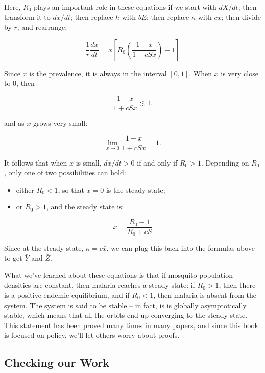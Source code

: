 \documentclass[
]{book}
\begin{document}
Here, \(R_0\) plays an important role in these equations if we start with \(dX/dt\); then transform it to \(dx/dt\); then replace \(h\) with \(bE\); then replace \(\kappa\) with \(cx\); then divide by \(r\); and rearrange:

\begin{equation}
\frac{1}{r} \frac{dx}{dt} = x \left[R_0 \left(\frac{1-x}{1 + cSx} \right)  - 1\right]  
\end{equation}

Since \(x\) is the prevalence, it is always in the interval \([0,1]\). When \(x\) is very close to \(0\), then

\begin{equation}
\frac{1-x}{1 + cSx} \lesssim 1. 
\end{equation}

and as \(x\) grows very small:

\begin{equation}
\lim_{x \rightarrow 0} \frac{1-x}{1 + cSx} = 1. 
\end{equation}

It follows that when \(x\) is small, \(dx/dt>0\) if and only if \(R_0 > 1\). Depending on \(R_0\), only one of two possibilities can hold:

\begin{itemize}
\item
  either \(R_0<1\), so that \(x=0\) is the steady state;
\item
  or \(R_0 > 1\), and the steady state is:
\end{itemize}

\begin{equation}
\bar x = \frac{R_0 -1}{R_0 + c S} 
\end{equation}

Since at the steady state, \(\kappa = c \bar x\), we can plug this back into the formulas above to get \(\bar Y\) and \(\bar Z\).

What we've learned about these equations is that if mosquito population densities are constant, then malaria reaches a steady state: if \(R_0 >1\), then there is a positive endemic equilibrium, and if \(R_0 < 1\), then malaria is absent from the system. The system is said to be stable -- in fact, is is globally asymptotically stable, which means that all the orbits end up converging to the steady state. This statement has been proved many times in many papers, and since this book is focused on policy, we'll let others worry about proofs.

\subsection{Checking our Work}\label{checking-our-work}
\end{document}
